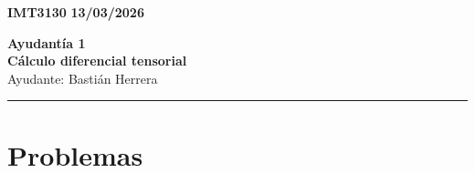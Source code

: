 \documentclass[11pt]{article}
\theoremstyle{thmstyle}
\begin{document}
    \begin{flushleft}
        \small
        \vspace{1pt}
        \textbf{IMT3130} \hfill
        \textbf{13/03/2026}
    \end{flushleft}
    \begin{center}
        \LARGE\textbf{Ayudantía 1}\\
        \vspace{3pt}
        \normalsize\textbf{Cálculo diferencial tensorial}\\
        \normalsize Ayudante: Bastián Herrera 
        \rule{\textwidth}{0.05mm}
    \end{center}

\section{Problemas}
\end{document}
